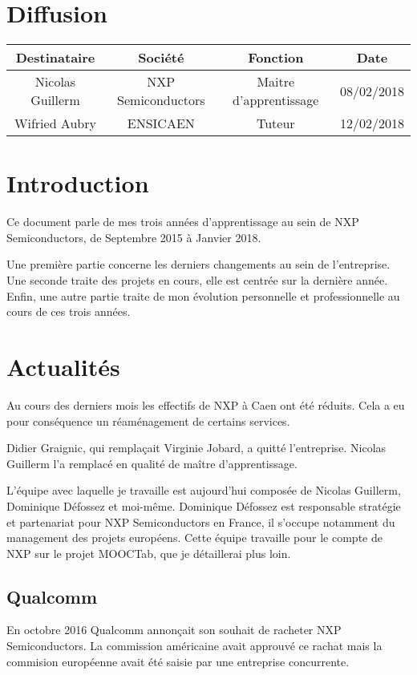 \documentclass[french,12pt,a4paper,titlepage,openright,openbib]{report}
\begin{document}
{\let \clearpage \relax \chapter*{Diffusion}}
\begin{table}[ht]
	\label{tab:diffusion}
	\centering
	\begin{tabular}{|c|c|c|c|}
		\hline
		{\bf Destinataire} & {\bf Société}      & {\bf Fonction}   		 & {\bf Date}\\
		\hline
		Nicolas Guillerm   & NXP Semiconductors & Maitre d'apprentissage & 08/02/2018 \\
		\hline
		Wifried Aubry      & ENSICAEN 			& Tuteur				 & 12/02/2018 \\
		\hline
	\end{tabular}
\end{table}

\chapter{Introduction}
Ce document parle de mes trois années d'apprentissage au sein de NXP Semiconductors, de Septembre 2015 à Janvier 2018.

Une première partie concerne les derniers changements au sein de l'entreprise.
Une seconde traite des projets en cours, elle est centrée sur la dernière année.
Enfin, une autre partie traite de mon évolution personnelle et professionnelle au cours de ces trois années.

\chapter{Actualités}
Au cours des derniers mois les effectifs de NXP à Caen ont été réduits. Cela a eu pour conséquence un réaménagement de certains services.

Didier Graignic, qui remplaçait Virginie Jobard, a quitté l'entreprise. Nicolas Guillerm l'a remplacé en qualité de maître d'apprentissage.

L'équipe avec laquelle je travaille est aujourd'hui composée de Nicolas Guillerm, Dominique Défossez et moi-même. Dominique Défossez est responsable stratégie et partenariat pour NXP Semiconductors en France, il s'occupe notamment du management des projets européens.
Cette équipe travaille pour le compte de NXP sur le projet MOOCTab, que je détaillerai plus loin.
\section{Qualcomm}
En octobre 2016 Qualcomm annonçait son souhait de racheter NXP Semiconductors. La commission américaine avait approuvé ce rachat mais la commision européenne avait été saisie par une entreprise concurrente.
\end{document}
